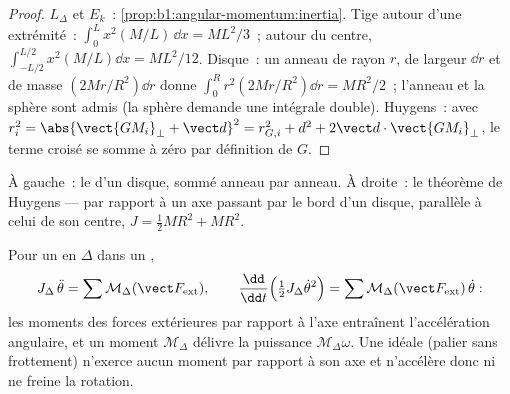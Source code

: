 \begin{proof}
$L_\Delta$ et $E_k$~: \cref{prop:b1:angular-momentum:inertia}. Tige
autour d'une extrémité~: $\int_0^L x^2(M/L)\,\dd x = ML^2/3$~; autour du
centre, $\int_{-L/2}^{L/2}
x^2(M/L)\dd x = ML^2/12$. Disque~: un anneau de rayon $r$, de largeur
$\dd r$ et de masse $(2Mr/R^2)\dd r$ donne $\int_0^R r^2(2Mr/R^2)\dd r = MR^2/2$~;
l'anneau et la sphère sont admis (la sphère demande une intégrale
double). Huygens~: avec $r_i^2 = \abs{\vect{GM_i}_\perp + \vect d}^2 = r_{G,i}^2 + d^2 + 2\vect d\cdot
\vect{GM_i}_\perp$, le terme croisé se somme à zéro par définition de $G$.
\end{proof}

\begin{omfigure}

{\small À gauche~: le  d'un disque, sommé anneau par
anneau. À droite~: le théorème de Huygens --- par rapport à un axe
passant par le bord d'un disque, parallèle à celui de son centre,
$J = \tfrac12 MR^2 + MR^2$.}
\end{omfigure}

\begin{theorem}\label{thm:b1:systems-of-points:rotation}
Pour un  en  $\Delta$ dans un
,
\[
J_\Delta\,\ddot\theta = \sum\mathcal M_\Delta(\vect F_{\mathrm{ext}}),
\qquad
\frac{\dd}{\dd t}\Big(\tfrac12 J_\Delta\dot\theta^2\Big) = \sum\mathcal M_\Delta(\vect F_{\mathrm{ext}})\,\dot\theta :
\]
les moments des forces extérieures par rapport à l'axe entraînent
l'accélération angulaire, et un moment $\mathcal M_\Delta$ délivre la
puissance $\mathcal M_\Delta\omega$. Une \emph{} idéale
(palier sans frottement) n'exerce aucun moment par rapport à son axe et
n'accélère donc ni ne freine la rotation.
\end{theorem}

